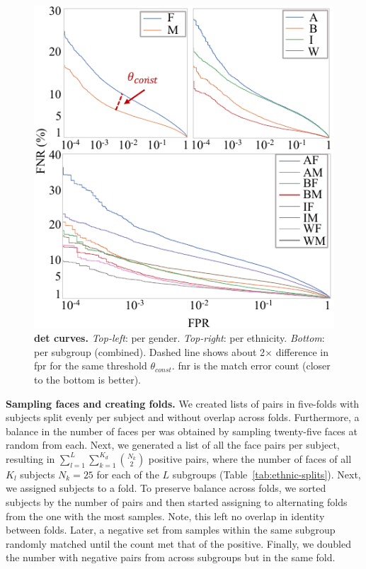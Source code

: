 \begin{figure}[!t] 
	\centering    
	\includegraphics[width=.9\linewidth]{figures/detcurve-improved.pdf}
		\caption{\small{\textbf{\gls{det} curves.} \emph{Top-left}: per gender. \emph{Top-right}: per ethnicity. \emph{Bottom}: per subgroup (\ie combined). Dashed line shows about 2$\times$ difference in \gls{fpr} for the same threshold $\theta_{const}$. \gls{fnr} is the match error count (closer to the bottom is better).}}
\label{fig:detcurves} 
\end{figure} 
\vspace{1mm}
\noindent\textbf{Sampling faces and creating folds.} We created lists of pairs in five-folds with subjects split evenly per subject and without overlap across folds. Furthermore, a balance in the number of faces per was obtained by sampling twenty-five faces at random from each. Next, we generated a list of all the face pairs per subject, resulting in $\sum_{l=1}^{L}\sum_{k=1}^{K_d} {N_k \choose 2}$ positive pairs, where the number of faces of all $K_l$ subjects $N_k=25$  for each of the $L$ subgroups (Table~\ref{tab:ethnic-splits}). Next, we assigned subjects to a fold. To preserve balance across folds, we sorted subjects by the number of pairs and then started assigning to alternating folds from the one with the most samples. Note, this left no overlap in identity between folds. Later, a negative set from samples within the same subgroup randomly matched until the count met that of the positive. Finally, we doubled the number with negative pairs from across subgroups but in the same fold.

